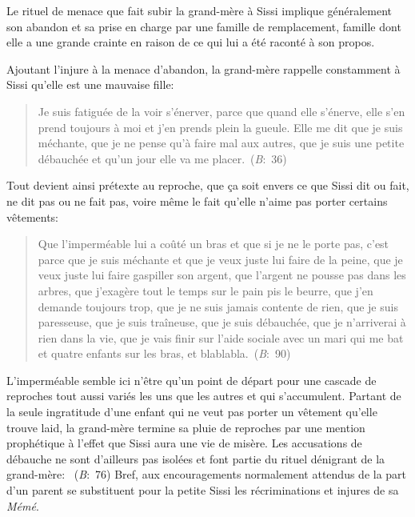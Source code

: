 Le rituel de menace que fait subir la grand-mère à Sissi implique généralement son abandon et sa prise en charge par une famille de remplacement, famille dont elle a une grande crainte en raison de ce qui lui a été raconté à son propos.
\par
Ajoutant l'injure à la menace d'abandon, la grand-mère rappelle constamment à Sissi qu'elle est une mauvaise fille:
\begin{quote}
  \begin{singlespace}
    \small
    Je suis fatiguée de la voir s'énerver, parce que quand elle s'énerve, elle s'en prend toujours à moi et j'en prends plein la gueule. Elle me dit que je suis méchante, que je ne pense qu'à faire mal aux autres, que je suis une petite débauchée et qu'un jour elle va me placer.~(\textit{B}:~36)
    \normalsize
  \end{singlespace}
\end{quote}
Tout devient ainsi prétexte au reproche, que ça soit envers ce que Sissi dit ou fait, ne dit pas ou ne fait pas, voire même le fait qu'elle n'aime pas porter certains vêtements:
\begin{quote}
  \begin{singlespace}
    \small
    Que l'imperméable lui a coûté un bras et que si je ne le porte pas, c'est parce que je suis méchante et que je veux juste lui faire de la peine, que je veux juste lui faire gaspiller son argent, que l'argent ne pousse pas dans les arbres, que j'exagère tout le temps sur le pain pis le beurre, que j'en demande toujours trop, que je ne suis jamais contente de rien, que je suis paresseuse, que je suis traîneuse, que je suis débauchée, que je n'arriverai à rien dans la vie, que je vais finir sur l'aide sociale avec un mari qui me bat et quatre enfants sur les bras, et blablabla.~(\textit{B}:~90)
    \normalsize
  \end{singlespace}
\end{quote}
L'imperméable semble ici n'être qu'un point de départ pour une cascade de reproches tout aussi variés les uns que les autres et qui s'accumulent.
Partant de la seule ingratitude d'une enfant qui ne veut pas porter un vêtement qu'elle trouve laid, la grand-mère termine sa pluie de reproches par une mention prophétique à l'effet que Sissi aura une vie de misère.
Les accusations de débauche ne sont d'ailleurs pas isolées et font partie du rituel dénigrant de la grand-mère: ~(\textit{B}:~76)
Bref, aux encouragements normalement attendus de la part d'un parent se substituent pour la petite Sissi les récriminations et injures de sa \textit{Mémé}.
